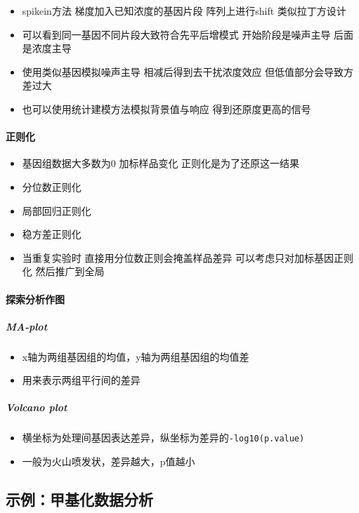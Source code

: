 \documentclass[]{book}
\providecommand{\tightlist}{%
  \setlength{\itemsep}{0pt}\setlength{\parskip}{0pt}}
\let\oldparagraph\paragraph
\renewcommand{\paragraph}[1]{\oldparagraph{#1}\mbox{}}
\let\oldsubparagraph\subparagraph
\renewcommand{\subparagraph}[1]{\oldsubparagraph{#1}\mbox{}}
\begin{document}
\begin{itemize}
\tightlist
\item
  spikein方法 梯度加入已知浓度的基因片段 阵列上进行shift 类似拉丁方设计
\item
  可以看到同一基因不同片段大致符合先平后增模式 开始阶段是噪声主导 后面是浓度主导
\item
  使用类似基因模拟噪声主导 相减后得到去干扰浓度效应 但低值部分会导致方差过大
\item
  也可以使用统计建模方法模拟背景值与响应 得到还原度更高的信号
\end{itemize}

\paragraph{正则化}

\begin{itemize}
\tightlist
\item
  基因组数据大多数为0 加标样品变化 正则化是为了还原这一结果
\item
  分位数正则化
\item
  局部回归正则化
\item
  稳方差正则化
\item
  当重复实验时 直接用分位数正则会掩盖样品差异 可以考虑只对加标基因正则化 然后推广到全局
\end{itemize}

\paragraph{探索分析作图}

\hypertarget{ma-plot}{%
\subparagraph{MA-plot}\label{ma-plot}}

\begin{itemize}
\tightlist
\item
  x轴为两组基因组的均值，y轴为两组基因组的均值差
\item
  用来表示两组平行间的差异
\end{itemize}

\hypertarget{volcano-plot}{%
\subparagraph{Volcano plot}\label{volcano-plot}}

\begin{itemize}
\tightlist
\item
  横坐标为处理间基因表达差异，纵坐标为差异的\texttt{-log10(p.value)}
\item
  一般为火山喷发状，差异越大，p值越小
\end{itemize}

\subsection{示例：甲基化数据分析}
\end{document}
